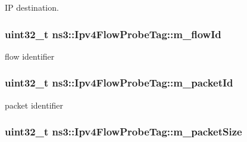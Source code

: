 IP destination. 

\subsubsection[{\texorpdfstring{m\+\_\+flow\+Id}{m_flowId}}]{\setlength{\rightskip}{0pt plus 5cm}uint32\+\_\+t ns3\+::\+Ipv4\+Flow\+Probe\+Tag\+::m\+\_\+flow\+Id\hspace{0.3cm}{\ttfamily [private]}}\hypertarget{classns3_1_1Ipv4FlowProbeTag_ad577bd999a96c16f46c0e0d142277b9b}{}\label{classns3_1_1Ipv4FlowProbeTag_ad577bd999a96c16f46c0e0d142277b9b}


flow identifier 

\subsubsection[{\texorpdfstring{m\+\_\+packet\+Id}{m_packetId}}]{\setlength{\rightskip}{0pt plus 5cm}uint32\+\_\+t ns3\+::\+Ipv4\+Flow\+Probe\+Tag\+::m\+\_\+packet\+Id\hspace{0.3cm}{\ttfamily [private]}}\hypertarget{classns3_1_1Ipv4FlowProbeTag_abba1edc37d1fdb662905387cb921f58b}{}\label{classns3_1_1Ipv4FlowProbeTag_abba1edc37d1fdb662905387cb921f58b}


packet identifier 

\subsubsection[{\texorpdfstring{m\+\_\+packet\+Size}{m_packetSize}}]{\setlength{\rightskip}{0pt plus 5cm}uint32\+\_\+t ns3\+::\+Ipv4\+Flow\+Probe\+Tag\+::m\+\_\+packet\+Size\hspace{0.3cm}{\ttfamily [private]}}\hypertarget{classns3_1_1Ipv4FlowProbeTag_a1d90f5197346dd77efe8a53143249ba6}{}\label{classns3_1_1Ipv4FlowProbeTag_a1d90f5197346dd77efe8a53143249ba6}


